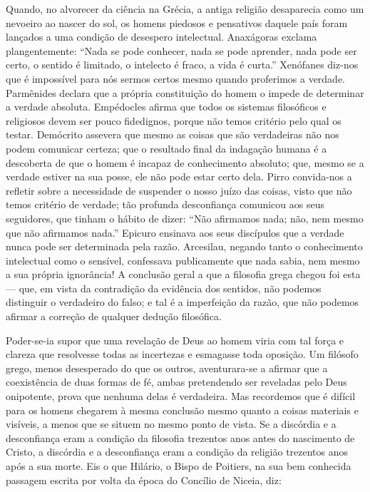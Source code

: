 \documentclass[11pt,a5paper,twoside,openany]{book}
\begin{document}
Quando, no alvorecer da ciência na Grécia, a antiga religião desaparecia como um nevoeiro ao nascer do sol, os homens piedosos e pensativos daquele país foram lançados a uma condição de desespero intelectual. Anaxágoras exclama plangentemente: “Nada se pode conhecer, nada se pode aprender, nada pode ser certo, o sentido é limitado, o intelecto é fraco, a vida é curta.” Xenófanes diz-nos que é impossível para nós sermos certos mesmo quando proferimos a verdade. Parmênides declara que a própria constituição do homem o impede de determinar a verdade absoluta. Empédocles afirma que todos os sistemas filosóficos e religiosos devem ser pouco fidedignos, porque não temos critério pelo qual os testar. Demócrito assevera que mesmo as coisas que são verdadeiras não nos podem comunicar certeza; que o resultado final da indagação humana é a descoberta de que o homem é incapaz de conhecimento absoluto; que, mesmo se a verdade estiver na sua posse, ele não pode estar certo dela. Pirro convida-nos a refletir sobre a necessidade de suspender o nosso juízo das coisas, visto que não temos critério de verdade; tão profunda desconfiança comunicou aos seus seguidores, que tinham o hábito de dizer: “Não afirmamos nada; não, nem mesmo que não afirmamos nada.” Epicuro ensinava aos seus discípulos que a verdade nunca pode ser determinada pela razão. Arcesilau, negando tanto o conhecimento intelectual como o sensível, confessava publicamente que nada sabia, nem mesmo a sua própria ignorância! A conclusão geral a que a filosofia grega chegou foi esta — que, em vista da contradição da evidência dos sentidos, não podemos distinguir o verdadeiro do falso; e tal é a imperfeição da razão, que não podemos afirmar a correção de qualquer dedução filosófica.

Poder-se-ia supor que uma revelação de Deus ao homem viria com tal força e clareza que resolvesse todas as incertezas e esmagasse toda oposição. Um filósofo grego, menos desesperado do que os outros, aventurara-se a afirmar que a coexistência de duas formas de fé, ambas pretendendo ser reveladas pelo Deus onipotente, prova que nenhuma delas é verdadeira. Mas recordemos que é difícil para os homens chegarem à mesma conclusão mesmo quanto a coisas materiais e visíveis, a menos que se situem no mesmo ponto de vista. Se a discórdia e a desconfiança eram a condição da filosofia trezentos anos antes do nascimento de Cristo, a discórdia e a desconfiança eram a condição da religião trezentos anos após a sua morte. Eis o que Hilário, o Bispo de Poitiers, na sua bem conhecida passagem escrita por volta da época do Concílio de Niceia, diz:
\end{document}
